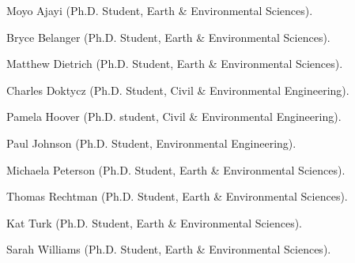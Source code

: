 \item Moyo Ajayi (Ph.D. Student, Earth \& Environmental Sciences).
\item Bryce Belanger (Ph.D. Student, Earth \& Environmental Sciences).
\item Matthew Dietrich (Ph.D. Student, Earth \& Environmental Sciences).
\item Charles Doktycz (Ph.D. Student, Civil \& Environmental Engineering).
\item Pamela Hoover (Ph.D. student, Civil \& Environmental Engineering).
\item Paul Johnson (Ph.D. Student, Environmental Engineering).
\item Michaela Peterson (Ph.D. Student, Earth \& Environmental Sciences).
\item Thomas Rechtman (Ph.D. Student, Earth \& Environmental Sciences).
\item Kat Turk (Ph.D. Student, Earth \& Environmental Sciences).
\item Sarah Williams (Ph.D. Student, Earth \& Environmental Sciences).
